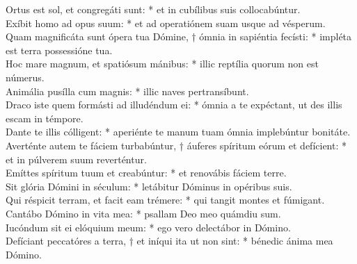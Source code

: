 {	Ortus est sol, et congregáti sunt: * et in cubílibus suis collocabúntur. \\
	Exíbit homo ad opus suum: * et ad operatiónem suam usque ad vésperum. \\
	Quam magnificáta sunt ópera tua Dómine, † ómnia in sapiéntia fecísti: * impléta est terra possessióne tua. \\
	Hoc mare magnum, et spatiósum mánibus: * illic reptília quorum non est númerus. \\
	Animália pusílla cum magnis: * illic naves pertransíbunt. \\
	Draco iste quem formásti ad illudéndum ei: * ómnia a te expéctant, ut des illis escam in témpore. \\
	Dante te illis cólligent: * aperiénte te manum tuam ómnia implebúntur bonitáte. \\
	Averténte autem te fáciem turbabúntur, † áuferes spíritum eórum et defícient: * et in púlverem suum reverténtur. \\
	Emíttes spíritum tuum et creabúntur: * et renovábis fáciem terre. \\
	Sit glória Dómini in séculum: * letábitur Dóminus in opéribus suis. \\
	Qui réspicit terram, et facit eam trémere: * qui tangit montes et fúmigant. \\
	Cantábo Dómino in vita mea: * psallam Deo meo quámdiu sum. \\
	Iucóndum sit ei elóquium meum: * ego vero delectábor in Dómino. \\
	Defíciant peccatóres a terra, † et iníqui ita ut non sint: * bénedic ánima mea Dómino.
}

